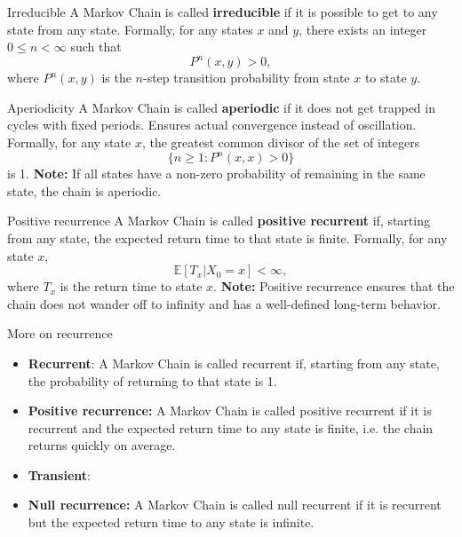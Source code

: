 \documentclass[aspectratio=169]{beamer}
\begin{document}
\begin{frame}{Irreducible}
    A Markov Chain is called \textbf{irreducible} if it is possible to get to any state 
    from any state. Formally, for any states $x$ and $y$, there exists an integer
    $0 \leq n < \infty$ such that
    \begin{equation*}
        P^n(x, y) > 0,
    \end{equation*}
    where $P^n(x, y)$ is the $n$-step transition probability from state $x$ to state $y$.
\end{frame}

\begin{frame}{Aperiodicity}
    A Markov Chain is called \textbf{aperiodic} if it does not get trapped in cycles with fixed periods. Ensures actual convergence instead of oscillation.
    Formally, for any state $x$, the greatest common divisor of the set of integers
    \begin{equation*}
        \{ n \geq 1 : P^n(x, x) > 0 \}
    \end{equation*}
    is 1.
    \textbf{Note:} If all states have a non-zero probability of remaining in the same state, the chain is aperiodic.
\end{frame}

\begin{frame}{Positive recurrence}
    A Markov Chain is called \textbf{positive recurrent} if, starting from any state, the expected return time to that state is finite. Formally, for any state $x$,
    \begin{equation*}
        \mathbb{E}[T_x | X_0 = x] < \infty,
    \end{equation*}
    where $T_x$ is the return time to state $x$.
    \textbf{Note:} Positive recurrence ensures that the chain does not wander off to infinity and has a well-defined long-term behavior.
\end{frame}

\begin{frame}{More on recurrence}
    \begin{itemize}
        \item \textbf{Recurrent}: A Markov Chain is called recurrent if, starting from any state, the probability of returning to that state is 1.
        \item \textbf{Positive recurrence:} A Markov Chain is called positive recurrent if it is recurrent and the expected return time to any state is finite, i.e. the chain returns quickly on average.
        \item \textbf{Transient}:
        \item \textbf{Null recurrence:} A Markov Chain is called null recurrent if it is recurrent but the expected return time to any state is infinite.
    \end{itemize}
\end{frame}
\end{document}

